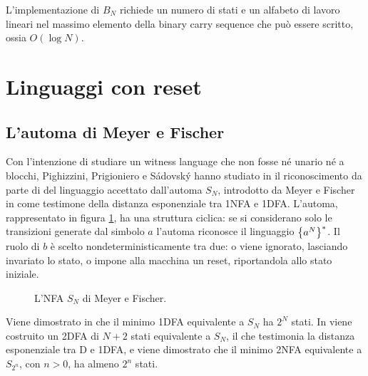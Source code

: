 L'implementazione di $B_N$ richiede un numero di stati e un alfabeto di lavoro lineari nel massimo elemento della binary carry sequence che può essere scritto, ossia $O(\log N)$.



\section{Linguaggi con reset}


\subsection{L'automa di Meyer e Fischer}
Con l'intenzione di studiare un witness language che non fosse né unario né a blocchi, Pighizzini, Prigioniero e Sádovský hanno studiato in \cite{Pighizzini:22:limitedwitness} il riconoscimento da parte di  del linguaggio accettato dall'automa $S_N$, introdotto da Meyer e Fischer in \cite{Meyer:71:ecodescription} come testimone della distanza esponenziale tra 1NFA e 1DFA. L'automa, rappresentato in figura \ref{img:wit:Sn}, ha una struttura ciclica: se si considerano solo le transizioni generate dal simbolo $a$ l'automa riconosce il linguaggio $\left\{ a^N \right\}^*$. Il ruolo di $b$ è scelto nondeterministicamente tra due: o viene ignorato, lasciando invariato lo stato, o impone alla macchina un reset, riportandola allo stato iniziale.

\begin{figure}
	\centering
	
	\caption{L'NFA $S_N$ di Meyer e Fischer.}
	\label{img:wit:Sn}
\end{figure}

Viene dimostrato in \cite{Meyer:71:ecodescription} che il minimo 1DFA equivalente a $S_N$ ha $2^N$ stati. In \cite{Pighizzini:22:limitedwitness} viene costruito un 2DFA di $N+2$ stati equivalente a $S_N$, il che testimonia la distanza esponenziale tra D e 1DFA, e viene dimostrato che il minimo 2NFA equivalente a $S_{2^n}$, con $n>0$, ha almeno $2^n$ stati.

